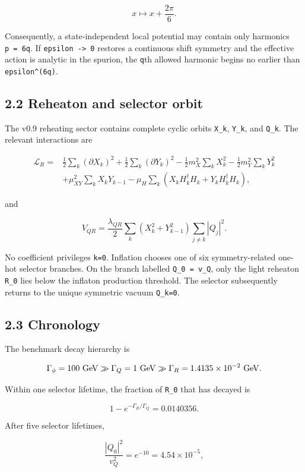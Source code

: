\documentclass[
  10pt,
  a4paper,
]{article}
\begin{document}
\[
x\mapsto x+\frac{2\pi}{6}.
\]

Consequently, a state-independent local potential may contain only
harmonics \texttt{p\ =\ 6q}. If \texttt{epsilon\ -\textgreater{}\ 0}
restores a continuous shift symmetry and the effective action is
analytic in the spurion, the \texttt{q}th allowed harmonic begins no
earlier than \texttt{epsilon\^{}(6q)}.

\subsection{2.2 Reheaton and selector
orbit}\label{reheaton-and-selector-orbit}

The v0.9 reheating sector contains complete cyclic orbits \texttt{X\_k},
\texttt{Y\_k}, and \texttt{Q\_k}. The relevant interactions are

\[
\begin{aligned}
\mathcal L_R={}&
\frac12\sum_k(\partial X_k)^2
+\frac12\sum_k(\partial Y_k)^2
-\frac12m_X^2\sum_kX_k^2
-\frac12m_Y^2\sum_kY_k^2
\\
&+\mu_{XY}^2\sum_kX_kY_{k-1}
-\mu_H\sum_k\left(
X_kH_k^\dagger H_k+Y_kH_k^\dagger H_k
\right),
\end{aligned}
\]

and

\[
V_{QR}
=
\frac{\lambda_{QR}}2
\sum_k
\left(X_k^2+Y_{k-1}^2\right)
\sum_{j\ne k}|Q_j|^2.
\]

No coefficient privileges \texttt{k=0}. Inflation chooses one of six
symmetry-related one-hot selector branches. On the branch labelled
\texttt{Q\_0\ =\ v\_Q}, only the light reheaton \texttt{R\_0} lies below
the inflaton production threshold. The selector subsequently returns to
the unique symmetric vacuum \texttt{Q\_k=0}.

\subsection{2.3 Chronology}\label{chronology}

The benchmark decay hierarchy is

\[
\Gamma_\phi=100\ {\rm GeV}
\gg
\Gamma_Q=1\ {\rm GeV}
\gg
\Gamma_R=1.4135\times10^{-2}\ {\rm GeV}.
\]

Within one selector lifetime, the fraction of \texttt{R\_0} that has
decayed is

\[
1-e^{-\Gamma_R/\Gamma_Q}
=0.0140356.
\]

After five selector lifetimes,

\[
\frac{|Q_0|^2}{v_Q^2}=e^{-10}=4.54\times10^{-5},
\]
\end{document}
